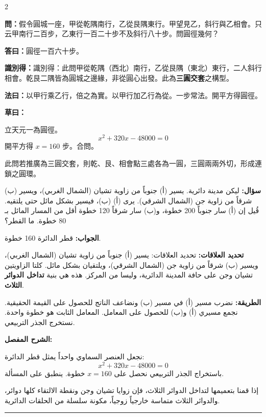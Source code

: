 \documentclass[11pt,a4paper]{article}
\newcommand{\ar}[1]{\arabicfont\beginR #1\endR}
\newcommand{\arb}[1]{\textbf{\arabicfont\beginR #1\endR}}
\newcommand{\longline}{\noindent\rule{\textwidth}{0.4pt}}
\newcommand{\arnote}[1]{\textcolor{arabicblue}{\ar{#1}}}
\newcommand{\wen}[1]{\par\noindent\textbf{\textcolor{probcolor}{問：}}{#1}\par}
\newcommand{\da}[1]{\par\noindent\textbf{\textcolor{anscolor}{答曰：}}{#1}\par}
\newcommand{\fayue}[1]{\par\noindent\textbf{\textcolor{methodcolor}{法曰：}}{#1}\par}
\newcommand{\caoyue}[1]{\par\noindent\textbf{草曰：}{#1}\par}
\newcommand{\zhi}[1]{\par\noindent\textbf{識別得：}{#1}\par}
\newcommand{\arwen}[1]{\par\noindent\arb{سؤال: }\arnote{#1}\par}
\newcommand{\arjwb}[1]{\par\noindent\arb{الجواب: }\arnote{#1}\par}
\newcommand{\arqwd}[1]{\par\noindent\arb{الطريقة: }\arnote{#1}\par}
\newcommand{\arshr}[1]{\par\noindent\arb{الشرح المفصل: }\arnote{#1}\par}
\newcommand{\arfl}[1]{\par\noindent\arb{تحديد العلاقات: }\arnote{#1}\par}
\begin{document}
\begin{paracol}{2}

\begin{leftcolumn}
\wen{假令圓城一座，甲從乾隅南行，乙從艮隅東行。甲望見乙，斜行與乙相會。只云甲南行二百步，乙東行一百二十步不及斜行八十步。問圓徑幾何？}

\da{圓徑一百六十步。}

\zhi{識別得：此問甲從乾隅（西北）南行，乙從艮隅（東北）東行，二人斜行相會。乾艮二隅皆為圓城之邊緣，非從圓心出發。此為\textbf{三圓交套}之構型。}

\fayue{以甲行乘乙行，倍之為實。以甲行加乙行為從。一步常法。開平方得圓徑。}

\caoyue{
立天元一為圓徑。
$$x^2 + 320x - 48000 = 0$$
開平方得 $x = 160$ 步。合問。

此問若推廣為三圓交套，則乾、艮、相會點三處各為一圓，三圓兩兩外切，形成連鎖之圓環。}
\end{leftcolumn}

\begin{rightcolumn}
\arwen{ليكن مدينة دائرية. يسير (أ) جنوباً من زاوية تشيان (الشمال الغربي)، ويسير (ب) شرقاً من زاوية جن (الشمال الشرقي). يرى (أ) (ب)، فيسير بشكل مائل حتى يلتقيه. قُيل إن (أ) سار جنوباً 200 خطوة، و(ب) سار شرقاً 120 خطوة أقل من المسار المائل بـ 80 خطوة. ما القطر؟}

\arjwb{قطر الدائرة 160 خطوة.}

\arfl{تحديد العلاقات: يسير (أ) جنوباً من زاوية تشيان (الشمال الغربي)، ويسير (ب) شرقاً من زاوية جن (الشمال الشرقي)، ويلتقيان بشكل مائل. كلتا الزاويتين تشيان وجن على حافة المدينة الدائرية، وليسا من المركز. هذه هي بنية \textbf{تداخل الدوائر الثلاث}.}

\arqwd{نضرب مسير (أ) في مسير (ب) ونضاعف الناتج للحصول على القيمة الحقيقية. نجمع مسيري (أ) و(ب) للحصول على المعامل. المعامل الثابت هو خطوة واحدة. نستخرج الجذر التربيعي.}

\arshr{نجعل العنصر السماوي واحداً يمثل قطر الدائرة:
$$x^2 + 320x - 48000 = 0$$
باستخراج الجذر التربيعي نحصل على $x = 160$ خطوة. ينطبق على المسألة.

إذا قمنا بتعميمها لتداخل الدوائر الثلاث، فإن زوايا تشيان وجن ونقطة الالتقاء كلها دوائر، والدوائر الثلاث متماسة خارجياً زوجياً، مكونة سلسلة من الحلقات الدائرية.}
\end{rightcolumn}

\end{paracol}

\vspace{0.3cm}
\longline

\end{document}
